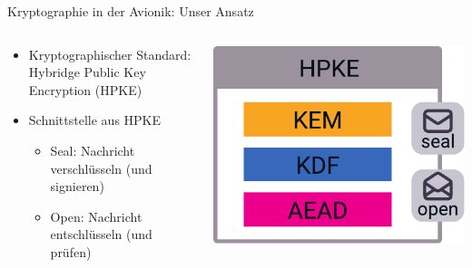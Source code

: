 \begin{frame}[c]{Kryptographie in der Avionik: Unser Ansatz}
  \begin{columns}[fullwidth,c]
    \begin{column}{.65\linewidth}
      \begin{itemize}
        \item Kryptographischer Standard:\\
        Hybridge Public Key Encryption (HPKE)
        \item Schnittstelle aus HPKE
        \begin{itemize}
          \item Seal: Nachricht verschlüsseln (und signieren)
          \item Open: Nachricht entschlüsseln (und prüfen)
        \end{itemize}

      \end{itemize}
    \end{column}%
    \begin{column}{.35\linewidth}
      
        \includegraphics[width=0.8\linewidth]{graphics/hpke}
    \end{column}
  \end{columns}
\end{frame}


